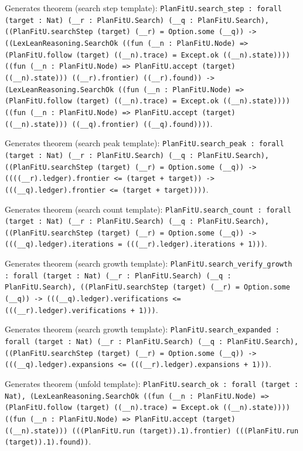 \documentclass[11pt]{article}
\begin{document}
\noindent Generates theorem (search step template): \texttt{PlanFitU.search\_step : forall (target : Nat) (\_\_r : PlanFitU.Search) (\_\_q : PlanFitU.Search), ((PlanFitU.searchStep (target) (\_\_r) = Option.some (\_\_q)) -> ((LexLeanReasoning.SearchOk ((fun (\_\_n : PlanFitU.Node) => (PlanFitU.follow (target) ((\_\_n).trace) = Except.ok ((\_\_n).state)))) ((fun (\_\_n : PlanFitU.Node) => PlanFitU.accept (target) ((\_\_n).state))) ((\_\_r).frontier) ((\_\_r).found)) -> (LexLeanReasoning.SearchOk ((fun (\_\_n : PlanFitU.Node) => (PlanFitU.follow (target) ((\_\_n).trace) = Except.ok ((\_\_n).state)))) ((fun (\_\_n : PlanFitU.Node) => PlanFitU.accept (target) ((\_\_n).state))) ((\_\_q).frontier) ((\_\_q).found))))}.\par
\noindent Generates theorem (search peak template): \texttt{PlanFitU.search\_peak : forall (target : Nat) (\_\_r : PlanFitU.Search) (\_\_q : PlanFitU.Search), ((PlanFitU.searchStep (target) (\_\_r) = Option.some (\_\_q)) -> ((((\_\_r).ledger).frontier <= (target + target)) -> (((\_\_q).ledger).frontier <= (target + target))))}.\par
\noindent Generates theorem (search count template): \texttt{PlanFitU.search\_count : forall (target : Nat) (\_\_r : PlanFitU.Search) (\_\_q : PlanFitU.Search), ((PlanFitU.searchStep (target) (\_\_r) = Option.some (\_\_q)) -> (((\_\_q).ledger).iterations = (((\_\_r).ledger).iterations + 1)))}.\par
\noindent Generates theorem (search growth template): \texttt{PlanFitU.search\_verify\_growth : forall (target : Nat) (\_\_r : PlanFitU.Search) (\_\_q : PlanFitU.Search), ((PlanFitU.searchStep (target) (\_\_r) = Option.some (\_\_q)) -> (((\_\_q).ledger).verifications <= (((\_\_r).ledger).verifications + 1)))}.\par
\noindent Generates theorem (search growth template): \texttt{PlanFitU.search\_expanded : forall (target : Nat) (\_\_r : PlanFitU.Search) (\_\_q : PlanFitU.Search), ((PlanFitU.searchStep (target) (\_\_r) = Option.some (\_\_q)) -> (((\_\_q).ledger).expansions <= (((\_\_r).ledger).expansions + 1)))}.\par
\noindent Generates theorem (unfold template): \texttt{PlanFitU.search\_ok : forall (target : Nat), (LexLeanReasoning.SearchOk ((fun (\_\_n : PlanFitU.Node) => (PlanFitU.follow (target) ((\_\_n).trace) = Except.ok ((\_\_n).state)))) ((fun (\_\_n : PlanFitU.Node) => PlanFitU.accept (target) ((\_\_n).state))) (((PlanFitU.run (target)).1).frontier) (((PlanFitU.run (target)).1).found))}.\par
\end{document}
